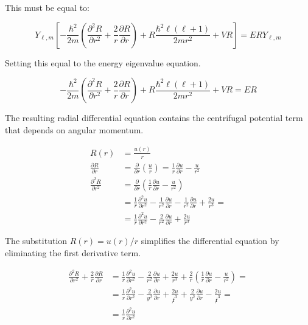 This must be equal to:

\begin{equation}
Y_{\ell, m}\left[-\frac{\hbar^{2}}{2 m}\left(\frac{\partial^{2} R}{\partial r^{2}}+\frac{2}{r} \frac{\partial R}{\partial r}\right)+R \frac{\hbar^{2} \ell(\ell+1)}{2 m r^{2}}+V R\right]=E R Y_{\ell, m}
\end{equation}

Setting this equal to the energy eigenvalue equation.

\begin{equation}
-\frac{\hbar^{2}}{2 m}\left(\frac{\partial^{2} R}{\partial r^{2}}+\frac{2}{r} \frac{\partial R}{\partial r}\right)+R \frac{\hbar^{2} \ell(\ell+1)}{2 m r^{2}}+V R=E R
\end{equation}

The resulting radial differential equation contains the centrifugal potential term that depends on angular momentum.

\begin{align}
R(r) & =\frac{u(r)}{r} \\
\frac{\partial R}{\partial r} & =\frac{\partial}{\partial r}\left(\frac{u}{r}\right)=\frac{1}{r} \frac{\partial u}{\partial r}-\frac{u}{r^{2}} \\
\frac{\partial^{2} R}{\partial r^{2}} & =\frac{\partial}{\partial r}\left(\frac{1}{r} \frac{\partial u}{\partial r}-\frac{u}{r^{2}}\right)  \\
& =\frac{1}{r} \frac{\partial^{2} u}{\partial r^{2}}-\frac{1}{r^{2}} \frac{\partial u}{\partial r}-\frac{1}{r^{2}} \frac{\partial u}{\partial r}+\frac{2 u}{r^{3}}= \\
& =\frac{1}{r} \frac{\partial^{2} u}{\partial r^{2}}-\frac{2}{r^{2}} \frac{\partial u}{\partial r}+\frac{2 u}{r^{3}}
\end{align}

The substitution $R(r) = u(r)/r$ simplifies the differential equation by eliminating the first derivative term.

\begin{align}
\frac{\partial^{2} R}{\partial r^{2}}+\frac{2}{r} \frac{\partial R}{\partial r} & =\frac{1}{r} \frac{\partial^{2} u}{\partial r^{2}}-\frac{2}{r^{2}} \frac{\partial u}{\partial r}+\frac{2 u}{r^{3}}+\frac{2}{r}\left(\frac{1}{r} \frac{\partial u}{\partial r}-\frac{u}{r^{2}}\right)= \\
& =\frac{1}{r} \frac{\partial^{2} u}{\partial r^{2}}-\frac{2}{y^{2}} \frac{\partial u}{\partial r}+\frac{2 u}{\not r^{3}}+\frac{2}{y^{2}} \frac{\partial u}{\partial r}-\frac{2 u}{\not r^{3}}=  \\
& =\frac{1}{r} \frac{\partial^{2} u}{\partial r^{2}}
\end{align}

